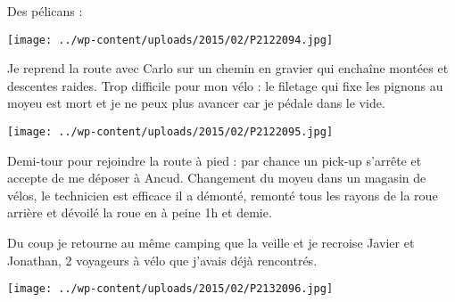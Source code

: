  Des pélicans :
\begin{center} \texttt{[image: ../wp-content/uploads/2015/02/P2122094.jpg]} \end{center}

 Je reprend la route avec Carlo sur un chemin en gravier qui enchaîne montées et descentes raides. 
 Trop difficile pour mon vélo : le filetage qui fixe les pignons au moyeu est mort et je ne peux plus avancer car je pédale dans le vide.
\begin{center} \texttt{[image: ../wp-content/uploads/2015/02/P2122095.jpg]} \end{center}

 Demi-tour pour rejoindre la route à pied : par chance un pick-up s'arrête et accepte de me déposer à Ancud.
 Changement du moyeu dans un magasin de vélos, le technicien est efficace il a démonté, remonté tous les rayons de la roue arrière et dévoilé la roue en à peine 1h et demie.

 Du coup je retourne au même camping que la veille et je recroise Javier et Jonathan, 2 voyageurs à vélo que j'avais déjà rencontrés.
\begin{center} \texttt{[image: ../wp-content/uploads/2015/02/P2132096.jpg]} \end{center}
